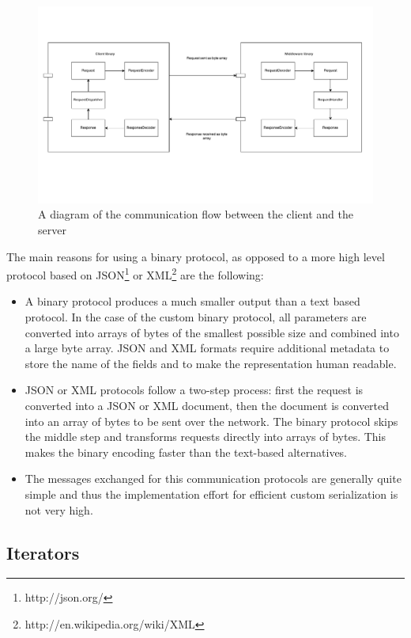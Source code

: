 \documentclass[11pt,a4paper]{globis-book}
\begin{document}
\begin{figure}[h]
    \centering 
    \includegraphics[scale=0.7]{images/Encoding}
    \caption{A diagram of the communication flow between the client and the server}
    \label{fig:Encoding}
\end{figure}

The main reasons for using a binary protocol, as opposed to a more high level protocol based on JSON\footnote{http://json.org/} or XML\footnote{http://en.wikipedia.org/wiki/XML} are the following:
\begin{itemize}
    \item A binary protocol produces a much smaller output than a text based protocol. In the case of the custom binary protocol, all parameters are converted into arrays of bytes of the smallest possible size and combined into a large byte array. JSON and XML formats require additional metadata to store the name of the fields and to make the representation human readable. 
    \item JSON or XML protocols follow a two-step process: first the request is converted into a JSON or XML document, then the document is converted into an array of bytes to be sent over the network. The binary protocol skips the middle step and transforms requests directly into arrays of bytes. This makes the binary encoding faster than the text-based alternatives.
    \item The messages exchanged for this communication protocols are generally quite simple and thus the implementation effort for efficient custom serialization is not very high. 
\end{itemize}

\subsection{Iterators}
\end{document}
